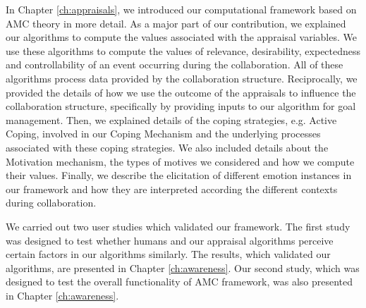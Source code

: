 \documentclass[12pt]{report}
\begin{document}
In Chapter \ref{ch:appraisals}, we introduced our computational framework based
on AMC theory in more detail. As a major part of our contribution, we explained
our algorithms to compute the values associated with the appraisal variables.
We use these algorithms to compute the values of relevance, desirability,
expectedness and controllability of an event occurring during the collaboration.
All of these algorithms process data provided by the collaboration structure.
Reciprocally, we provided the details of how we use the outcome of the
appraisals to influence the collaboration structure, specifically by providing
inputs to our algorithm for goal management. Then, we explained details of the
coping strategies, e.g. Active Coping, involved in our Coping Mechanism and the
underlying processes associated with these coping strategies. We also included
details about the Motivation mechanism, the types of motives we considered and
how we compute their values. Finally, we describe the elicitation of different
emotion instances in our framework and how they are interpreted according the
different contexts during collaboration.

We carried out two user studies which validated our framework. The first study
was designed to test whether humans and our appraisal algorithms perceive
certain factors in our algorithms similarly. The results, which validated our
algorithms, are presented in Chapter \ref{ch:awareness}. Our second study, which
was designed to test the overall functionality of AMC framework, was also
presented in Chapter \ref{ch:awareness}.

\end{document}

